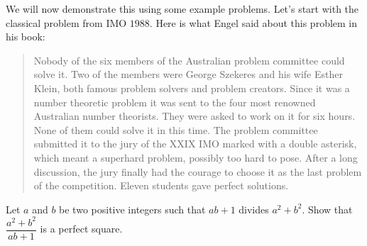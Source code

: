 \documentclass{subfile}
\begin{document}
	We will now demonstrate this using some example problems. Let's start with the classical problem from IMO $1988$. Here is what Engel said about this problem in his book:
		\begin{quote}
			Nobody of the six members of the Australian problem committee could solve it. Two of the members were George Szekeres and his wife Esther Klein, both famous problem solvers and problem creators. Since it was a number theoretic problem it was sent to the four most renowned Australian number theorists. They were asked to work on it for six hours. None of them could solve it in this time. The problem committee submitted it to the jury of the XXIX IMO marked with a double asterisk, which meant a superhard problem, possibly too hard to pose. After a long discussion, the jury finally had the courage to choose it as the last problem of the competition. Eleven students gave perfect solutions.
		\end{quote}

	\begin{problem}
		Let $ a$ and $ b$ be two positive integers such that $ab + 1$ divides $ a^{2} + b^{2}$. Show that $\dfrac{a^{2}+b^{2}}{ab+1}$ is a perfect square.
	\end{problem}
\end{document}
